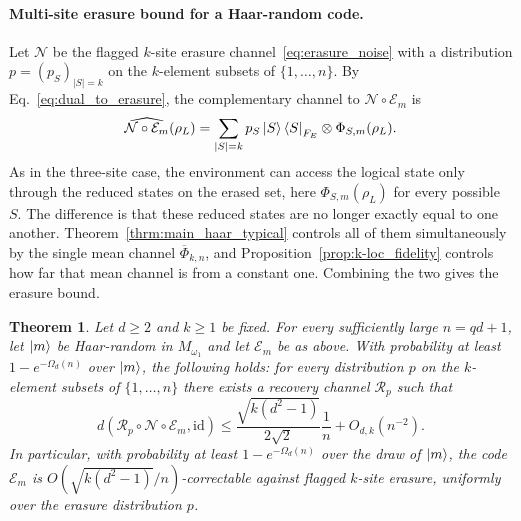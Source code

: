 \documentclass[10pt,twocolumn,superscriptaddress,aps,amsmath,amssymb,citeautoscript,floatfix,prx]{revtex4-2}
\newtheorem{theorem}{Theorem}
\theoremstyle{plain}
\theoremstyle{plain}
\theoremstyle{plain}
\theoremstyle{plain}
\theoremstyle{plain}
\theoremstyle{plain}
\theoremstyle{plain}
\theoremstyle{definition}
\theoremstyle{plain}
\begin{document}
\paragraph{Multi-site erasure bound for a Haar-random code.}
Let $\mathcal N$ be the flagged $k$-site erasure channel~\eqref{eq:erasure_noise} with a distribution $p=(p_S)_{|S|=k}$ 
on the $k$-element subsets of $\{1,\ldots,n\}$. By Eq.~\eqref{eq:dual_to_erasure}, the complementary channel to $\mathcal N\circ\mathcal E_m$ is
$$
\widehat{\mathcal N\circ\mathcal E_m}(\rho_L)
=
\sum_{|S|=k}
p_S
\ket S\bra S_{F_E}
\otimes
\Phi_{S,m}(\rho_L).
$$
As in the three-site case, the environment can access the logical state only through the reduced states on the erased set, here $\Phi_{S,m}(\rho_L)$ for every possible $S$. 
The difference is that these reduced states are no longer exactly equal to one another. 
Theorem~\ref{thrm:main_haar_typical} controls all of them simultaneously by the single mean channel $\overline\Phi_{k,n}$, 
and Proposition~\ref{prop:k-loc_fidelity} controls how far that mean channel is from a constant one. 
Combining the two gives the erasure bound.

\begin{theorem}\label{thrm:main_multisite_erasure_haar}
Let $d\ge2$ and $k\ge1$ be fixed. For every sufficiently large $n=qd+1$, let $\ket m$ be Haar-random in $M_{\omega_1}$ and let $\mathcal E_m$ be as above. With probability at least $1-e^{-\Omega_d(n)}$ over $\ket m$, the following holds: for every distribution $p$ on the $k$-element subsets of $\{1,\ldots,n\}$ there exists a recovery channel $\mathcal R_p$ such that
$$
d\left(
\mathcal R_p\circ\mathcal N\circ\mathcal E_m,
\mathrm{id}
\right)
\le
\frac{\sqrt{k(d^2-1)}}{2\sqrt2}
\frac1n
+
O_{d,k}(n^{-2}).
$$
In particular, with probability at least $1-e^{-\Omega_d(n)}$ over the draw of $\ket m$, the code $\mathcal E_m$ is $O(\sqrt{k(d^2-1)}/n)$-correctable against flagged $k$-site erasure, uniformly over the erasure distribution $p$.
\end{theorem}
\end{document}
